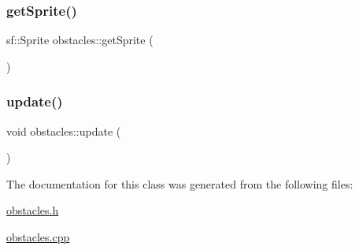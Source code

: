 \mbox{\label{classobstacles_a94bf656073cb771ce03b3b1aa783d21a}} 
\subsubsection{\texorpdfstring{get\+Sprite()}{getSprite()}}
{\footnotesize\ttfamily sf\+::\+Sprite obstacles\+::get\+Sprite (\begin{DoxyParamCaption}{ }\end{DoxyParamCaption})}

\mbox{\label{classobstacles_afebab4f703daedbb7b9140ce750b84bd}} 
\subsubsection{\texorpdfstring{update()}{update()}}
{\footnotesize\ttfamily void obstacles\+::update (\begin{DoxyParamCaption}{ }\end{DoxyParamCaption})}



The documentation for this class was generated from the following files\+:\begin{DoxyCompactItemize}
\item 
\hyperlink{obstacles_8h}{obstacles.\+h}\item 
\hyperlink{obstacles_8cpp}{obstacles.\+cpp}\end{DoxyCompactItemize}
